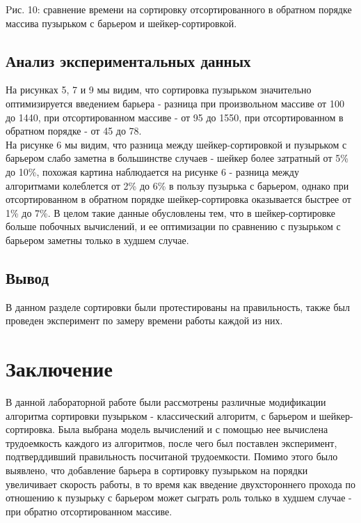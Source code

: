 \documentclass[a4paper, 14pt]{article}
\begin{document}
\begin{center}
\begin{flushleft}
Pис. 10: сравнение времени на сортировку отсортированного в обратном порядке массива пузырьком с барьером и шейкер-сортировкой.\\
\end{flushleft}
\end{center}
\subsection{Анализ экспериментальных данных}
	На рисунках 5, 7 и 9 мы видим, что сортировка пузырьком значительно оптимизируется введением барьера - разница при произвольном массиве от 100 до 1440, при отсортированном массиве - от 95 до 1550, при отсортированном в обратном порядке - от 45 до 78.\\
	На рисунке 6 мы видим, что разница между шейкер-сортировкой и пузырьком с барьером слабо заметна в большинстве случаев - шейкер более затратный от 5\% до 10\%, похожая картина наблюдается на рисунке 6 - разница между алгоритмами колеблется от 2\% до 6\% в пользу пузырька с барьером, однако при отсортированном в обратном порядке шейкер-сортировка оказывается быстрее от 1\% до  7\%. В целом такие данные обусловлены тем, что в шейкер-сортировке больше побочных вычислений, и ее оптимизации по сравнению с пузырьком с барьером заметны только в худшем случае. 
	\subsection{Вывод}
		В данном разделе сортировки были протестированы на правильность, также был проведен эксперимент по замеру времени работы каждой из них.
  


    	\newpage
        \section*{Заключение}
        В данной лабораторной работе были рассмотрены различные модификации алгоритма сортировки пузырьком - классический алгоритм, с барьером и шейкер-сортировка. Была выбрана модель вычислений и с помощью нее вычислена трудоемкость каждого из алгоритмов, после чего был поставлен эксперимент, подтверддивший правильность посчитаной трудоемкости. Помимо этого было выявлено, что добавление барьера в сортировку пузырьком на порядки увеличивает скорость работы, в то время как введение двухстороннего прохода по отношению к пузырьку с барьером может сыграть роль только в худшем случае - при обратно отсортированном массиве.
\end{document}
